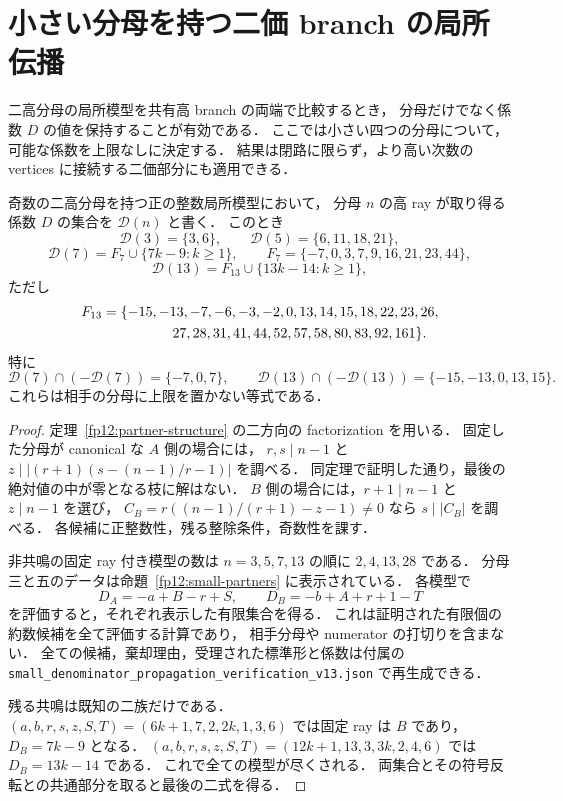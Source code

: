 \section{小さい分母を持つ二価 branch の局所伝播}
\label{sp13:section}

二高分母の局所模型を共有高 branch の両端で比較するとき，
分母だけでなく係数 $D$ の値を保持することが有効である．
ここでは小さい四つの分母について，可能な係数を上限なしに決定する．
結果は閉路に限らず，より高い次数の vertices に接続する二価部分にも適用できる．

\begin{proposition}[固定した小分母の係数集合]
\label{sp13:coefficient-sets}
奇数の二高分母を持つ正の整数局所模型において，
分母 $n$ の高 ray が取り得る係数 $D$ の集合を $\mathcal D(n)$ と書く．
このとき
\[
 \mathcal D(3)=\{3,6\},\qquad
 \mathcal D(5)=\{6,11,18,21\},
\]
\[
 \mathcal D(7)=F_7\cup\{7k-9:k\geq1\},\qquad
 F_7=\{-7,0,3,7,9,16,21,23,44\},
\]
\[
 \mathcal D(13)=F_{13}\cup\{13k-14:k\geq1\},
\]
ただし
\begin{align*}
 F_{13}={}&\{-15,-13,-7,-6,-3,-2,0,13,14,15,18,22,23,26,\notag\\
          &\hspace{13mm}27,28,31,41,44,52,57,58,80,83,92,161\}.
\end{align*}
特に
\[
 \mathcal D(7)\cap(-\mathcal D(7))=\{-7,0,7\},\qquad
 \mathcal D(13)\cap(-\mathcal D(13))=\{-15,-13,0,13,15\}.
\]
これらは相手の分母に上限を置かない等式である．
\end{proposition}

\begin{proof}
定理~\ref{fp12:partner-structure} の二方向の factorization を用いる．
固定した分母が canonical な $A$ 側の場合には，
$r,s\mid n-1$ と $z\mid|(r+1)(s-(n-1)/r-1)|$ を調べる．
同定理で証明した通り，最後の絶対値の中が零となる枝に解はない．
$B$ 側の場合には，$r+1\mid n-1$ と $z\mid n-1$ を選び，
$C_B=r((n-1)/(r+1)-z-1)\ne0$ なら $s\mid|C_B|$ を調べる．
各候補に正整数性，残る整除条件，奇数性を課す．

非共鳴の固定 ray 付き模型の数は $n=3,5,7,13$ の順に $2,4,13,28$ である．
分母三と五のデータは命題~\ref{fp12:small-partners} に表示されている．
各模型で
\[
 D_A=-a+B-r+S,\qquad D_B=-b+A+r+1-T
\]
を評価すると，それぞれ表示した有限集合を得る．
これは証明された有限個の約数候補を全て評価する計算であり，
相手分母や numerator の打切りを含まない．
全ての候補，棄却理由，受理された標準形と係数は付属の
\texttt{small\_denominator\_propagation\_verification\_v13.json}
で再生成できる．

残る共鳴は既知の二族だけである．
$(a,b,r,s,z,S,T)=(6k+1,7,2,2k,1,3,6)$ では固定 ray は $B$ であり，
$D_B=7k-9$ となる．
$(a,b,r,s,z,S,T)=(12k+1,13,3,3k,2,4,6)$ では $D_B=13k-14$ である．
これで全ての模型が尽くされる．
両集合とその符号反転との共通部分を取ると最後の二式を得る．
\end{proof}

